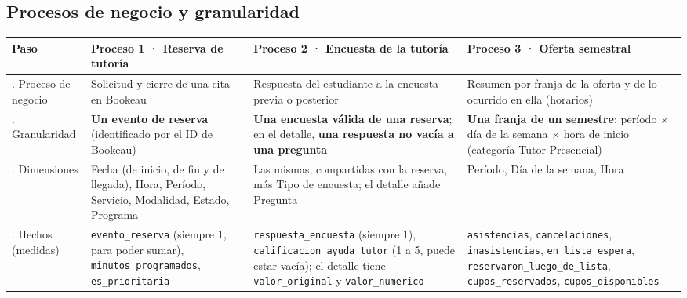 \documentclass[11pt,letterpaper]{article}
\begin{document}
\subsection{Procesos de negocio y granularidad}

\begingroup\small\setlength{\tabcolsep}{4pt}\renewcommand{\arraystretch}{1.15}
\begin{longtable}{>{\raggedright\arraybackslash}p{}>{\raggedright\arraybackslash}p{}>{\raggedright\arraybackslash}p{}>{\raggedright\arraybackslash}p{}}
\toprule
\textbf{Paso} & \textbf{Proceso 1 · Reserva de tutoría} & \textbf{Proceso 2 · Encuesta de la tutoría} & \textbf{Proceso 3 · Oferta semestral} \\
\midrule
\endhead
1. Proceso de negocio & Solicitud y cierre de una cita en Bookeau & Respuesta del estudiante a la encuesta previa o posterior & Resumen por franja de la oferta y de lo ocurrido en ella (horarios) \\
2. Granularidad & \textbf{Un evento de reserva} (identificado por el ID de Bookeau) & \textbf{Una encuesta válida de una reserva}; en el detalle, \textbf{una respuesta no vacía a una pregunta} & \textbf{Una franja de un semestre}: período $\times$ día de la semana $\times$ hora de inicio (categoría Tutor Presencial) \\
3. Dimensiones & Fecha (de inicio, de fin y de llegada), Hora, Período, Servicio, Modalidad, Estado, Programa & Las mismas, compartidas con la reserva, más Tipo de encuesta; el detalle añade Pregunta & Período, Día de la semana, Hora \\
4. Hechos (medidas) & \texttt{evento\_\allowbreak{}reserva} (siempre 1, para poder sumar), \texttt{minutos\_\allowbreak{}programados}, \texttt{es\_\allowbreak{}prioritaria} & \texttt{respuesta\_\allowbreak{}encuesta} (siempre 1), \texttt{calificacion\_\allowbreak{}ayuda\_\allowbreak{}tutor} (1 a 5, puede estar vacía); el detalle tiene \texttt{valor\_\allowbreak{}original} y \texttt{valor\_\allowbreak{}numerico} & \texttt{asistencias}, \texttt{cancelaciones}, \texttt{inasistencias}, \texttt{en\_\allowbreak{}lista\_\allowbreak{}espera}, \texttt{reservaron\_\allowbreak{}luego\_\allowbreak{}de\_\allowbreak{}lista}, \texttt{cupos\_\allowbreak{}reservados}, \texttt{cupos\_\allowbreak{}disponibles} \\
\bottomrule
\end{longtable}
\endgroup
\end{document}
